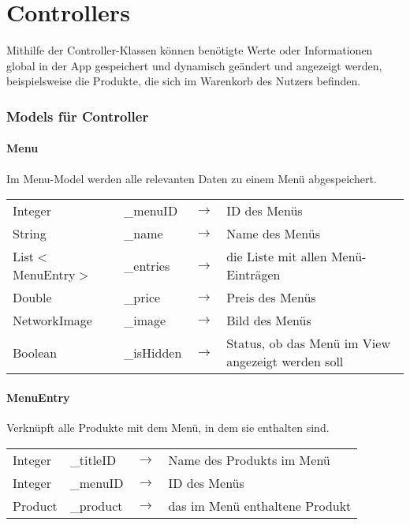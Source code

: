 \section{Controllers}

Mithilfe der Controller-Klassen können benötigte Werte oder Informationen global in der App
gespeichert und dynamisch geändert und angezeigt werden, beispielsweise die Produkte, die sich 
im Warenkorb des Nutzers befinden.

\subsubsection{Models für Controller}

\paragraph{Menu}

Im Menu-Model werden alle relevanten Daten zu einem Menü abgespeichert.

\begin{tabular}{l l r l}
    Integer & \_menuID & $\rightarrow$ & ID des Menüs\\
    String & \_name & $\rightarrow$ & Name des Menüs\\
    List$<$MenuEntry$>$ & \_entries & $\rightarrow$ & die Liste mit allen Menü-Einträgen\\
    Double & \_price & $\rightarrow$ & Preis des Menüs\\
    NetworkImage & \_image & $\rightarrow$ & Bild des Menüs\\
    Boolean & \_isHidden & $\rightarrow$ & Status, ob das Menü im View angezeigt werden soll
\end{tabular}

\paragraph{MenuEntry}

Verknüpft alle Produkte mit dem Menü, in dem sie enthalten sind.

\begin{tabular}{l l r l}
    Integer & \_titleID & $\rightarrow$ & Name des Produkts im Menü\\
    Integer & \_menuID & $\rightarrow$ & ID des Menüs\\
    Product & \_product & $\rightarrow$ & das im Menü enthaltene Produkt\\
\end{tabular}
 
